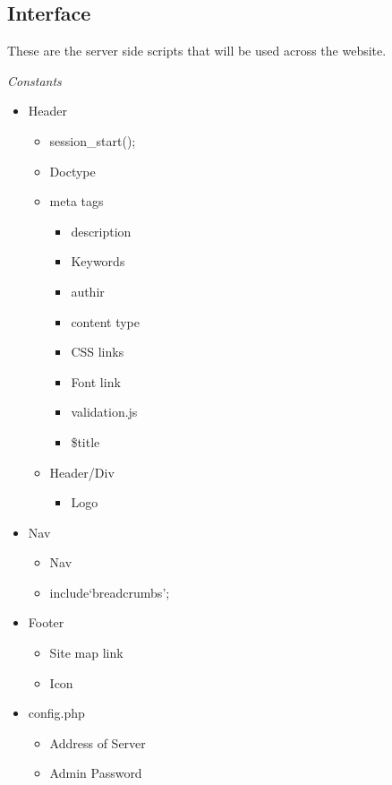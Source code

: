 \subsection{Interface}
	These are the server side scripts that will be used across the website.

	\emph{Constants}
	\begin{itemize}
		\item Header
		\begin{itemize}
			\item session\_start();
			\item Doctype
			\item meta tags
			\begin{itemize}
				\item description
				\item Keywords
				\item authir
				\item content type
				\item CSS links
				\item Font link
				\item validation.js
				\item \$title
			\end{itemize}
			\item Header/Div
			\begin{itemize}
				\item Logo
			\end{itemize}
		\end{itemize}

		\item Nav
		\begin{itemize}
			\item Nav
			\item include`breadcrumbs';
		\end{itemize}
		\item Footer 
		\begin{itemize}
			\item Site map link 
			\item Icon
		\end{itemize}
			
		\item config.php
		\begin{itemize}
			\item Address of Server
			\item Admin Password
		\end{itemize}


\end{itemize}
